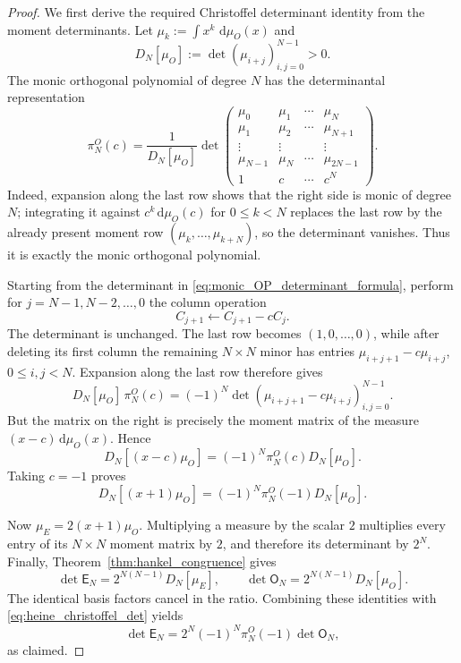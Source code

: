 \documentclass[preprint,12pt]{elsarticle}
\numberwithin{equation}{section}
\theoremstyle{plain}
\theoremstyle{definition}
\theoremstyle{remark}
\newcommand{\E}{\mathsf E}
\newcommand{\Omat}{\mathsf O}
\newcommand{\dd}{\,\mathrm d}
\begin{document}
\begin{proof}
We first derive the required Christoffel determinant identity from the moment determinants.  Let $\mu_k:=\int x^k\,\dd\mu_O(x)$ and
\begin{equation}
D_N[\mu_O]:=\det(\mu_{i+j})_{i,j=0}^{N-1}>0.
\end{equation}
The monic orthogonal polynomial of degree $N$ has the determinantal representation
\begin{equation}
\pi_N^O(c)
=\frac{1}{D_N[\mu_O]}
\det\begin{pmatrix}
\mu_0&\mu_1&\cdots&\mu_N\\
\mu_1&\mu_2&\cdots&\mu_{N+1}\\
\vdots&\vdots&&\vdots\\
\mu_{N-1}&\mu_N&\cdots&\mu_{2N-1}\\
1&c&\cdots&c^N
\end{pmatrix}.
\label{eq:monic_OP_determinant_formula}
\end{equation}
Indeed, expansion along the last row shows that the right side is monic of degree $N$; integrating it against $c^k\dd\mu_O(c)$ for $0\le k<N$ replaces the last row by the already present moment row $(\mu_k,\ldots,\mu_{k+N})$, so the determinant vanishes.  Thus it is exactly the monic orthogonal polynomial.

Starting from the determinant in \eqref{eq:monic_OP_determinant_formula}, perform for $j=N-1,N-2,\ldots,0$ the column operation
\begin{equation}
C_{j+1}\leftarrow C_{j+1}-cC_j.
\end{equation}
The determinant is unchanged.  The last row becomes $(1,0,\ldots,0)$, while after deleting its first column the remaining $N\times N$ minor has entries
$\mu_{i+j+1}-c\mu_{i+j}$, $0\le i,j<N$.  Expansion along the last row therefore gives
\begin{equation}
D_N[\mu_O]\,\pi_N^O(c)
=(-1)^N\det(\mu_{i+j+1}-c\mu_{i+j})_{i,j=0}^{N-1}.
\end{equation}
But the matrix on the right is precisely the moment matrix of the measure $(x-c)\dd\mu_O(x)$.  Hence
\begin{equation}
D_N[(x-c)\mu_O]
=(-1)^N\pi_N^O(c)D_N[\mu_O].
\label{eq:heine_christoffel_general}
\end{equation}
Taking $c=-1$ proves
\begin{equation}
D_N[(x+1)\mu_O]
=(-1)^N\pi_N^O(-1)D_N[\mu_O].
\label{eq:heine_christoffel_det}
\end{equation}

Now $\mu_E=2(x+1)\mu_O$.  Multiplying a measure by the scalar $2$ multiplies every entry of its $N\times N$ moment matrix by $2$, and therefore its determinant by $2^N$.  Finally, Theorem~\ref{thm:hankel_congruence} gives
\begin{equation}
\det\E_N=2^{N(N-1)}D_N[\mu_E],
\qquad
\det\Omat_N=2^{N(N-1)}D_N[\mu_O].
\end{equation}
The identical basis factors cancel in the ratio.  Combining these identities with \eqref{eq:heine_christoffel_det} yields
\begin{equation}
\det\E_N
=2^N(-1)^N\pi_N^O(-1)\det\Omat_N,
\end{equation}
as claimed.
\end{proof}
\end{document}
